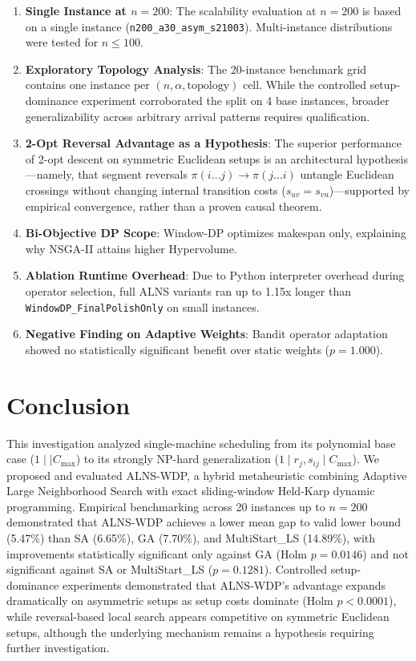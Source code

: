 \documentclass[journal]{IEEEtran}
\begin{document}
\begin{enumerate}
    \item \textbf{Single Instance at $n=200$}: The scalability evaluation at $n=200$ is based on a single instance (\texttt{n200\_a30\_asym\_s21003}). Multi-instance distributions were tested for $n \le 100$.
    \item \textbf{Exploratory Topology Analysis}: The 20-instance benchmark grid contains one instance per $(n, \alpha, \text{topology})$ cell. While the controlled setup-dominance experiment corroborated the split on 4 base instances, broader generalizability across arbitrary arrival patterns requires qualification.
    \item \textbf{2-Opt Reversal Advantage as a Hypothesis}: The superior performance of 2-opt descent on symmetric Euclidean setups is an architectural hypothesis—namely, that segment reversals $\pi(i \dots j) \to \pi(j \dots i)$ untangle Euclidean crossings without changing internal transition costs ($s_{uv} = s_{vu}$)—supported by empirical convergence, rather than a proven causal theorem.
    \item \textbf{Bi-Objective DP Scope}: Window-DP optimizes makespan only, explaining why NSGA-II attains higher Hypervolume.
    \item \textbf{Ablation Runtime Overhead}: Due to Python interpreter overhead during operator selection, full ALNS variants ran up to 1.15x longer than \texttt{WindowDP\_FinalPolishOnly} on small instances.
    \item \textbf{Negative Finding on Adaptive Weights}: Bandit operator adaptation showed no statistically significant benefit over static weights ($p = 1.000$).
\end{enumerate}

\section{Conclusion}
\label{sec:conclusion}

This investigation analyzed single-machine scheduling from its polynomial base case ($1 \mid\mid C_{\max}$) to its strongly NP-hard generalization ($1 \mid r_j, s_{ij} \mid C_{\max}$). We proposed and evaluated ALNS-WDP, a hybrid metaheuristic combining Adaptive Large Neighborhood Search with exact sliding-window Held-Karp dynamic programming. Empirical benchmarking across 20 instances up to $n=200$ demonstrated that ALNS-WDP achieves a lower mean gap to valid lower bound (5.47\%) than SA (6.65\%), GA (7.70\%), and MultiStart\_LS (14.89\%), with improvements statistically significant only against GA (Holm $p = 0.0146$) and not significant against SA or MultiStart\_LS ($p = 0.1281$). Controlled setup-dominance experiments demonstrated that ALNS-WDP's advantage expands dramatically on asymmetric setups as setup costs dominate (Holm $p < 0.0001$), while reversal-based local search appears competitive on symmetric Euclidean setups, although the underlying mechanism remains a hypothesis requiring further investigation.
\end{document}
